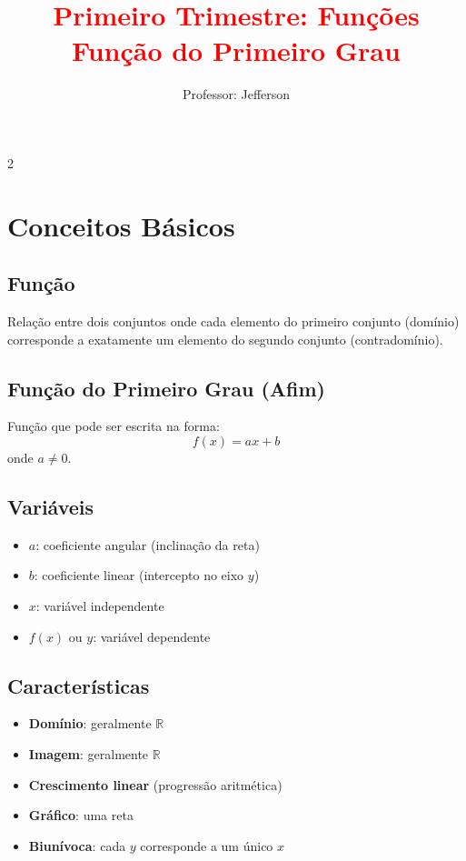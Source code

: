 \documentclass[11pt]{article}
\title{\textcolor{red}{Primeiro Trimestre: Funções
    \\Função do Primeiro Grau}}
\author{Professor: Jefferson}
\date{}
\begin{document}
\maketitle
\vspace{-1cm}


\begin{multicols}{2}

\section*{Conceitos Básicos}

\subsection*{Função}
Relação entre dois conjuntos onde cada elemento do primeiro conjunto (domínio) corresponde a exatamente um elemento do segundo conjunto (contradomínio).

\subsection*{Função do Primeiro Grau (Afim)}
Função que pode ser escrita na forma:
\[
f(x) = ax + b
\]
onde $a \neq 0$.

\subsection*{Variáveis}
\begin{itemize}
\item $a$: coeficiente angular (inclinação da reta)
\item $b$: coeficiente linear (intercepto no eixo $y$)
\item $x$: variável independente
\item $f(x)$ ou $y$: variável dependente
\end{itemize}

\subsection*{Características}
\begin{itemize}
\item \textbf{Domínio}: geralmente $\mathbb{R}$
\item \textbf{Imagem}: geralmente $\mathbb{R}$
\item \textbf{Crescimento linear} (progressão aritmética)
\item \textbf{Gráfico}: uma reta
\item \textbf{Biunívoca}: cada $y$ corresponde a um único $x$
\end{itemize}


\end{multicols}
\end{document}
